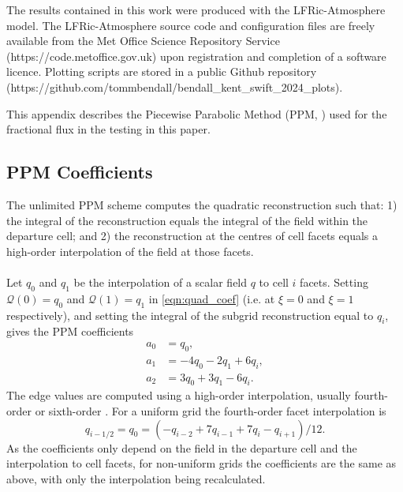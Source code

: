 \documentclass{ametsocV6.1}
\begin{document}
The results contained in this work were produced with the LFRic-Atmosphere model.
The LFRic-Atmosphere source code and configuration files are freely available from the Met Office Science Repository Service
(https://code.metoffice.gov.uk) upon registration and completion of a software licence.
Plotting scripts are stored in a  public Github repository (https://github.com/tommbendall/bendall\_kent\_swift\_2024\_plots).


\appendix[A] \label{sec:ppm_appendix}


This appendix describes the Piecewise Parabolic Method (PPM, \citet{colella1984ppm}) used for the fractional flux in the testing in this paper.

\subsection{PPM Coefficients} \label{sec:ppm_recon}

The unlimited PPM scheme \citep{colella1984ppm} computes the quadratic reconstruction such that: 1) the integral of the reconstruction equals the integral of the field within the departure cell; and 2) the reconstruction at the centres of cell facets equals a high-order interpolation of the field at those facets. \\
\\
Let $q_0$ and $q_1$ be the interpolation of a scalar field $q$ to cell $i$ facets. Setting $\mathcal{Q}(0)=q_0$ and $\mathcal{Q}(1) = q_1$ in \eqref{eqn:quad_coef} (i.e. at $\xi=0$ and $\xi=1$ respectively), and setting the integral of the subgrid reconstruction equal to $q_i$, gives the PPM coefficients
\begin{subequations}
\begin{align}
    a_0 &= q_0, \\
    a_1 &= -4 q_0 - 2 q_1 + 6 q_i, \\
    a_2 &= 3 q_0 + 3 q_1 - 6 q_i.
\end{align}
\end{subequations}
The edge values are computed using a high-order interpolation, usually fourth-order \citep{colella1984ppm} or sixth-order \citep{colella2008}.
For a uniform grid the fourth-order facet interpolation is
\begin{equation}
    q_{i-1/2} = q_0 = \left( -q_{i-2} + 7 q_{i-1} + 7 q_{i} - q_{i+1}\right)/12.
\end{equation}
As the coefficients only depend on the field in the departure cell and the interpolation to cell facets, for non-uniform grids the coefficients are the same as above, with only the interpolation being recalculated.  
\end{document}
